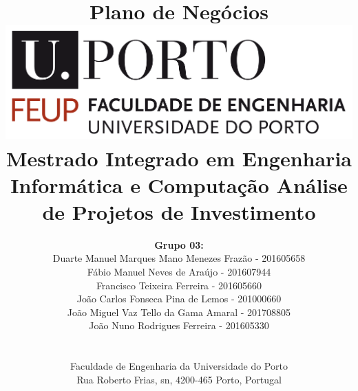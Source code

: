 \documentclass[a4paper]{article}
\begin{document}
\setlength{\textwidth}{16cm}
\setlength{\textheight}{22cm}

\title{\Huge\textbf{Plano de Negócios}\linebreak\linebreak\linebreak
\linebreak\linebreak
\includegraphics[scale=0.1]{feup-logo.png}\linebreak\linebreak
\linebreak\linebreak
\Large{Mestrado Integrado em Engenharia Informática e Computação} \linebreak\linebreak
\Large{Análise de Projetos de Investimento}\linebreak
}

\author{\textbf{Grupo 03:}\\
Duarte Manuel Marques Mano Menezes Frazão - 201605658 \\
Fábio Manuel Neves de Araújo - 201607944 \\
Francisco Teixeira Ferreira - 201605660 \\
João Carlos Fonseca Pina de Lemos - 201000660 \\
João Miguel Vaz Tello da Gama Amaral - 201708805 \\
João Nuno Rodrigues Ferreira - 201605330\\\linebreak\linebreak \\
 \\ Faculdade de Engenharia da Universidade do Porto \\ Rua Roberto Frias, s\/n, 4200-465 Porto, Portugal \linebreak\linebreak\linebreak
\linebreak\linebreak\vspace{1cm}}
\maketitle
\thispagestyle{empty}
\end{document}
